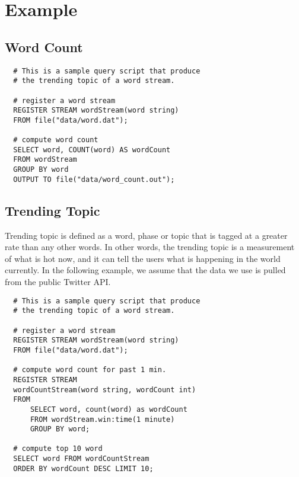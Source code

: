 \documentclass[conference, twocolumn, 11pt]{IEEEtran}
\theoremstyle{definition}
\begin{document}
\section{Example}\label{example}
\subsection{Word Count}
\footnotesize\begin{verbatim}
  # This is a sample query script that produce
  # the trending topic of a word stream.

  # register a word stream
  REGISTER STREAM wordStream(word string)
  FROM file("data/word.dat");

  # compute word count
  SELECT word, COUNT(word) AS wordCount
  FROM wordStream
  GROUP BY word
  OUTPUT TO file("data/word_count.out");
\end{verbatim}
\normalsize
\subsection{Trending Topic}
Trending topic is defined as a word, phase or topic that is tagged at a greater rate than any other words. In other words, the trending topic is a measurement of what is hot now, and it
can tell the users what is happening in the world currently. In the following example, we assume that the data we use is pulled from the public Twitter API.
\footnotesize\begin{verbatim}
  # This is a sample query script that produce
  # the trending topic of a word stream.

  # register a word stream
  REGISTER STREAM wordStream(word string)
  FROM file("data/word.dat");

  # compute word count for past 1 min.
  REGISTER STREAM
  wordCountStream(word string, wordCount int)
  FROM
      SELECT word, count(word) as wordCount
      FROM wordStream.win:time(1 minute)
      GROUP BY word;

  # compute top 10 word
  SELECT word FROM wordCountStream
  ORDER BY wordCount DESC LIMIT 10;
\end{verbatim}
\normalsize
\end{document}

